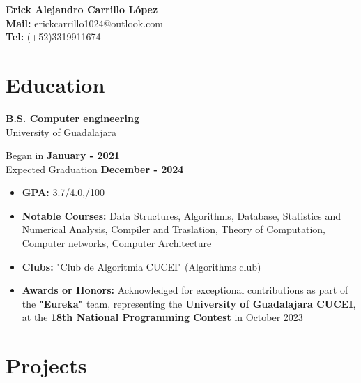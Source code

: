 \documentclass[11pt]{article}
\begin{document}
 \thispagestyle{empty}
\begin{center}
\Large{\textbf{Erick Alejandro Carrillo López} \\
  \textbf{Mail:} erickcarrillo1024@outlook.com\\
  \textbf{Tel:} (+52)3319911674}
\quad\quad \href{https://github.com/alecksandr26}{\color{blue}{Github}}
  \quad\quad \href{https://www.linkedin.com/in/erick-alejandro-carrillo-lopez-988112219/}{\color{blue}{Linkedin}}
\end{center}
\vspace{-0.5cm}
\section*{Education}
\vspace{-0.4cm}
\titlerule[0.3pt]
\vspace{-0.4cm}

\begin{multicols}{2}
  \noindent
  \textbf{B.S. Computer engineering}\\
  University of Guadalajara
  
  \columnbreak
  \noindent
  Began in \textbf{January - 2021}\\
  Expected Graduation \textbf{December -  2024}
\end{multicols}
\vspace{-0.3cm}
\begin{itemize}[noitemsep, nolistsep]
\item \textbf{GPA:} 3.7/4.0,/100
\item \textbf{Notable Courses:} Data Structures, Algorithms, Database, Statistics and Numerical Analysis,
  Compiler and Traslation, Theory of Computation, Computer networks, Computer Architecture
\item \textbf{Clubs:} "Club de Algoritmia CUCEI" (Algorithms club)
\item \textbf{Awards or Honors:} Acknowledged for exceptional contributions as part of the \textbf{"Eureka"}
  team, representing the \textbf{University of Guadalajara CUCEI}, at the
  \textbf{18th National Programming Contest} in October 2023

\end{itemize}
\vspace{-0.4cm}
\section*{Projects}
\vspace{-0.4cm}
\titlerule[0.3pt]
\vspace{0.1cm}
\end{document}
